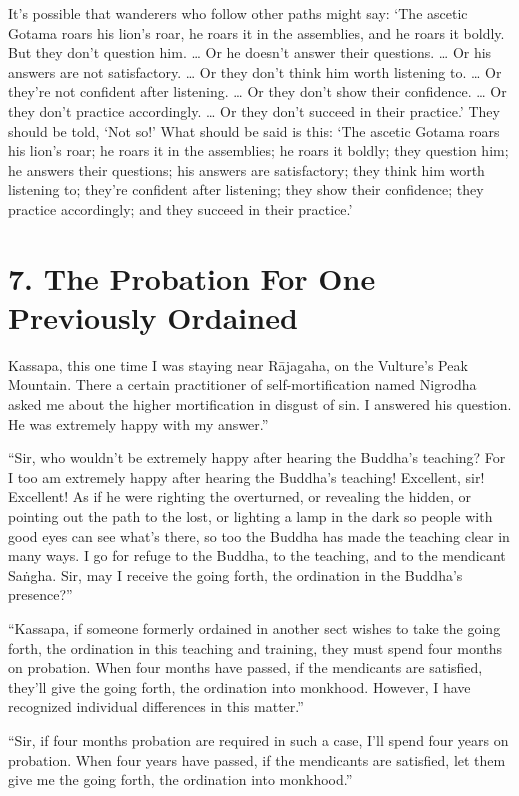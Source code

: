 \documentclass[12pt,openany]{book}%
\begin{document}
It’s possible that wanderers who follow other paths might say: ‘The ascetic Gotama roars his lion’s roar, he roars it in the assemblies, and he roars it boldly. But they don’t question him. … Or he doesn’t answer their questions. … Or his answers are not satisfactory. … Or they don’t think him worth listening to. … Or they’re not confident after listening. … Or they don’t show their confidence. … Or they don’t practice accordingly. … Or they don’t succeed in their practice.’ They should be told, ‘Not so!’ What should be said is this: ‘The ascetic Gotama roars his lion’s roar; he roars it in the assemblies; he roars it boldly; they question him; he answers their questions; his answers are satisfactory; they think him worth listening to; they’re confident after listening; they show their confidence; they practice accordingly; and they succeed in their practice.’ 

\section*{7. The Probation For One Previously Ordained }

Kassapa, this one time I was staying near \textsanskrit{Rājagaha}, on the Vulture’s Peak Mountain. There a certain practitioner of self-mortification named Nigrodha asked me about the higher mortification in disgust of sin. I answered his question. He was extremely happy with my answer.” 

“Sir, who wouldn’t be extremely happy after hearing the Buddha’s teaching? For I too am extremely happy after hearing the Buddha’s teaching! Excellent, sir! Excellent! As if he were righting the overturned, or revealing the hidden, or pointing out the path to the lost, or lighting a lamp in the dark so people with good eyes can see what’s there, so too the Buddha has made the teaching clear in many ways. I go for refuge to the Buddha, to the teaching, and to the mendicant \textsanskrit{Saṅgha}. Sir, may I receive the going forth, the ordination in the Buddha’s presence?” 

“Kassapa, if someone formerly ordained in another sect wishes to take the going forth, the ordination in this teaching and training, they must spend four months on probation. When four months have passed, if the mendicants are satisfied, they’ll give the going forth, the ordination into monkhood. However, I have recognized individual differences in this matter.” 

“Sir, if four months probation are required in such a case, I’ll spend four years on probation. When four years have passed, if the mendicants are satisfied, let them give me the going forth, the ordination into monkhood.” 
\end{document}
